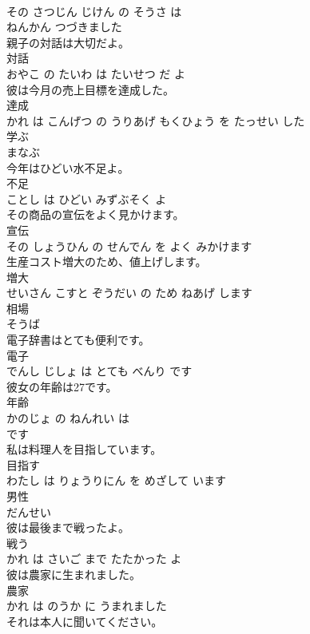 \documentclass[8pt]{extreport}
\begin{document}
\begin{CJK}{UTF8}{min}
\\	その さつじん じけん の そうさ は 
\\	ねんかん つづきました			
\\	親子の対話は大切だよ。	
\\	対話 
\\	おやこ の たいわ は たいせつ だ よ			
\\	彼は今月の売上目標を達成した。	
\\	達成 
\\	かれ は こんげつ の うりあげ もくひょう を たっせい した			
\\	学ぶ	
\\	まなぶ		
\\	今年はひどい水不足よ。	
\\	不足 
\\	ことし は ひどい みずぶそく よ			
\\	その商品の宣伝をよく見かけます。	
\\	宣伝 
\\	その しょうひん の せんでん を よく みかけます			
\\	生産コスト増大のため、値上げします。	
\\	増大 
\\	せいさん こすと ぞうだい の ため ねあげ します			
\\	相場	
\\	そうば		
\\	電子辞書はとても便利です。	
\\	電子 
\\	でんし じしょ は とても べんり です			
\\	彼女の年齢は27です。	
\\	年齢 
\\	かのじょ の ねんれい は 
\\	です			
\\	私は料理人を目指しています。	
\\	目指す 
\\	わたし は りょうりにん を めざして います			
\\	男性	
\\	だんせい		
\\	彼は最後まで戦ったよ。	
\\	戦う 
\\	かれ は さいご まで たたかった よ			
\\	彼は農家に生まれました。	
\\	農家 
\\	かれ は のうか に うまれました			
\\	それは本人に聞いてください。	

\end{CJK}
\end{document}
